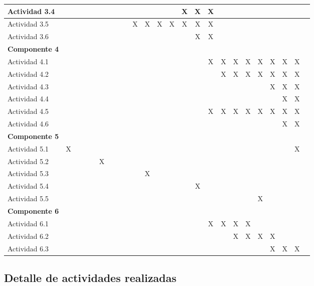 \documentclass[]{article}
\begin{document}
\begin{table}[!htb]
{\begin{tabular}{|l|c|c|c|c|c|c|c|c|c|c|c|c|c|c|c|c|c|c|c|c|c|c|c|}
    Actividad 3.4 & & & & & & & & & & & & & X & X & X & & & & & & & \\ \hline
    Actividad 3.5 & & & & & & & & & X & X & X & X & X & X & X & & & & & & & \\ \hline
    Actividad 3.6 & & & & & & & & & & & & & & X & X & & & & & & & \\ \hline
    \textbf{Componente 4} & \multicolumn{22}{|l|}{}\\ \hline
    Actividad 4.1 & & & & & & & & & & & & & & & X & X & X & X & X & X & X & X\\ \hline
    Actividad 4.2 & & & & & & & & & & & & & & & & X & X & X & X & X & X & X\\ \hline
    Actividad 4.3 & & & & & & & & & & & & & & & & & & & & X & X & X \\ \hline
    Actividad 4.4 & & & & & & & & & & & & & & & & & & & & & X & X\\ \hline
    Actividad 4.5 & & & & & & & & & & & & & & & X & X & X & X & X & X & X & X\\ \hline
    Actividad 4.6 & & & & & & & & & & & & & & & & & & & & & X & X\\ \hline
    \textbf{Componente 5} & \multicolumn{22}{|l|}{}\\ \hline
    Actividad 5.1 & X & & & & & & & & & & & & & & & & & & & & & X\\ \hline
    Actividad 5.2 & & & & & X & & & & & & & & & & & & & & & & & \\ \hline
    Actividad 5.3 & & & & & & & & & & X & & & & & & & & & & & & \\ \hline
    Actividad 5.4 & & & & & & & & & & & & & & X & & & & & & & & \\ \hline
    Actividad 5.5 & & & & & & & & & & & & & & & & & & & X & & & \\ \hline
    \textbf{Componente 6} & \multicolumn{22}{|l|}{}\\ \hline
    Actividad 6.1 & & & & & & & & & & & & & & & X & X & X & X & & & & \\ \hline
    Actividad 6.2 & & & & & & & & & & & & & & & & & X & X & X & X & & \\ \hline
    Actividad 6.3 & & & & & & & & & & & & & & & & & & & & X & X & X\\ \hline
\end{tabular}
}
\end{table}

\clearpage
\subsection{Detalle de actividades realizadas}
\end{document}
